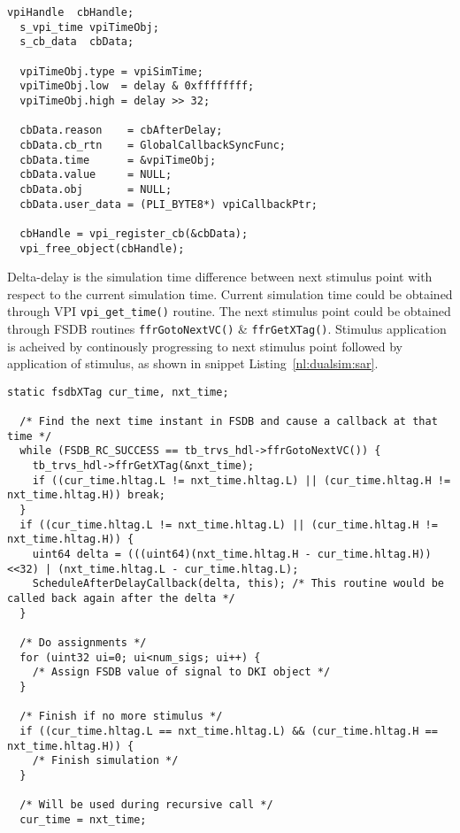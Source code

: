 \lstset{language=C++,
basicstyle=\footnotesize,
frame=shadowbox,
breaklines=true}          
\begin{lstlisting}[frame=single, caption=Scheduling a VPI callback,label=nl:dualsim:svc] 
  vpiHandle  cbHandle;
  s_vpi_time vpiTimeObj;
  s_cb_data  cbData;

  vpiTimeObj.type = vpiSimTime;
  vpiTimeObj.low  = delay & 0xffffffff;
  vpiTimeObj.high = delay >> 32;

  cbData.reason    = cbAfterDelay;
  cbData.cb_rtn    = GlobalCallbackSyncFunc;
  cbData.time      = &vpiTimeObj;
  cbData.value     = NULL;
  cbData.obj       = NULL;
  cbData.user_data = (PLI_BYTE8*) vpiCallbackPtr;

  cbHandle = vpi_register_cb(&cbData);
  vpi_free_object(cbHandle);
\end{lstlisting}

Delta-delay is the simulation time difference between next stimulus point with respect to the current simulation time. Current simulation time could be obtained through VPI \verb|vpi_get_time()| routine. The next stimulus point could be obtained through FSDB routines \verb|ffrGotoNextVC()| \& \verb|ffrGetXTag()|. Stimulus application is acheived by continously progressing to next stimulus point followed by application of stimulus, as shown in snippet Listing~\ref{nl:dualsim:sar}.

\lstset{language=C++,
basicstyle=\footnotesize,
frame=shadowbox,
breaklines=true}          
\begin{lstlisting}[frame=single, caption=Stimulus Applicator Routine,label=nl:dualsim:sar] 
  static fsdbXTag cur_time, nxt_time;

  /* Find the next time instant in FSDB and cause a callback at that time */
  while (FSDB_RC_SUCCESS == tb_trvs_hdl->ffrGotoNextVC()) {
    tb_trvs_hdl->ffrGetXTag(&nxt_time);
    if ((cur_time.hltag.L != nxt_time.hltag.L) || (cur_time.hltag.H != nxt_time.hltag.H)) break;
  }
  if ((cur_time.hltag.L != nxt_time.hltag.L) || (cur_time.hltag.H != nxt_time.hltag.H)) {
    uint64 delta = (((uint64)(nxt_time.hltag.H - cur_time.hltag.H))<<32) | (nxt_time.hltag.L - cur_time.hltag.L);
    ScheduleAfterDelayCallback(delta, this); /* This routine would be called back again after the delta */
  }

  /* Do assignments */
  for (uint32 ui=0; ui<num_sigs; ui++) {
    /* Assign FSDB value of signal to DKI object */
  }

  /* Finish if no more stimulus */
  if ((cur_time.hltag.L == nxt_time.hltag.L) && (cur_time.hltag.H == nxt_time.hltag.H)) {
    /* Finish simulation */
  }

  /* Will be used during recursive call */
  cur_time = nxt_time;
\end{lstlisting}

